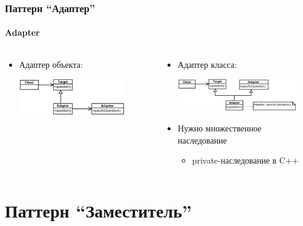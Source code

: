 \documentclass[xetex,mathserif,serif]{beamer}
\begin{document}
	\begin{frame}
		\frametitle{Паттерн ``Адаптер''}
		\framesubtitle{Adapter}
		\begin{columns}
			\begin{column}{0.5\textwidth}
				\begin{itemize}
					\item Адаптер объекта:
						\vspace{0.3cm}
						
						\includegraphics[width=0.8\textwidth]{objectAdapter.png}
				\end{itemize}
			\end{column}
			\begin{column}{0.5\textwidth}
				\begin{itemize}
					\item Адаптер класса:
						\vspace{0.3cm}
						
						\includegraphics[width=0.9\textwidth]{classAdapter.png}
						\vspace{0.3cm}
					\item Нужно множественное наследование
					\begin{itemize}
						\item private-наследование в C++
					\end{itemize}
				\end{itemize}
			\end{column}
		\end{columns}
	\end{frame}

	\section{Паттерн ``Заместитель''}
\end{document}
